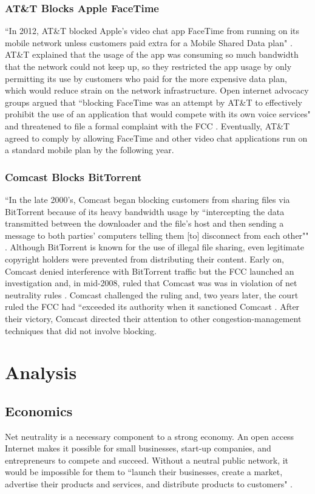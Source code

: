 \documentclass[11pt]{article}
\begin{document}
\subsubsection{AT\&T Blocks Apple FaceTime}
``In 2012, AT\&T blocked Apple's video chat app FaceTime from running on its mobile network unless customers paid extra for a Mobile Shared Data plan" \cite{DD}.  AT\&T explained that the usage of the app was consuming so much bandwidth that the network could not keep up, so they restricted the app usage by only permitting its use by customers who paid for the more expensive data plan, which would reduce strain on the network infrastructure.  Open internet advocacy groups argued that ``blocking FaceTime was an attempt by AT\&T to effectively prohibit the use of an application that would compete with its own voice services" and threatened to file a formal complaint with the FCC \cite{DD}.  Eventually, AT\&T agreed to comply by allowing FaceTime and other video chat applications run on a standard mobile plan by the following year.

\subsubsection{Comcast Blocks BitTorrent}
``In the late 2000's, Comcast began blocking customers from sharing files via BitTorrent because of its heavy bandwidth usage by ``intercepting the data transmitted between the downloader and the file's host and then sending a message to both parties' computers telling them [to] disconnect from each other"" \cite{DD}.  Although BitTorrent is known for the use of illegal file sharing, even legitimate copyright holders were prevented from distributing their content.  Early on, Comcast denied interference with BitTorrent traffic but the FCC launched an investigation and, in mid-2008, ruled that Comcast was was in violation of net neutrality rules \cite{DD}.  Comcast challenged the ruling and, two years later, the court ruled the FCC had ``exceeded its authority when it sanctioned Comcast \cite{DD}.  After their victory, Comcast directed their attention to other congestion-management techniques that did not involve blocking.

\section{Analysis}
\subsection{Economics}
Net neutrality is a necessary component to a strong economy.  An open access Internet makes it possible for small businesses, start-up companies, and entrepreneurs to compete and succeed.  Without a neutral public network, it would be impossible for them to ``launch their businesses, create a market, advertise their products and services, and distribute products to customers" \cite{FP}.  
\end{document}
